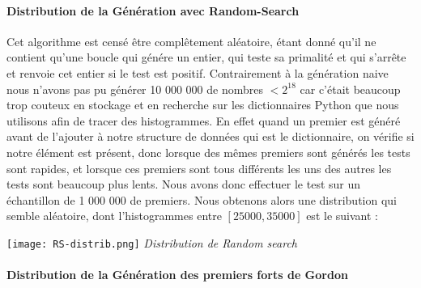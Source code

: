 \documentclass[a4paper,11pt]{article}
\begin{document}
\paragraph{Distribution de la Génération avec Random-Search}
Cet algorithme est censé être  complêtement aléatoire, étant donné qu'il ne contient qu'une boucle qui génére un entier, qui teste sa primalité et qui s'arrête et renvoie cet entier si le test est positif. Contrairement à la génération naive nous n'avons pas pu générer 10 000 000 de nombres $< 2^{18}$ car c'était beaucoup trop couteux en stockage et en recherche sur les dictionnaires Python que nous utilisons afin de tracer des histogrammes. En effet quand un premier est généré avant de l'ajouter à notre structure de données qui est le dictionnaire, on vérifie si notre élément est présent, donc lorsque des mêmes premiers sont générés les tests sont rapides, et lorsque ces premiers sont tous différents les uns des autres les tests sont beaucoup plus lents. Nous avons donc effectuer le test sur un échantillon de 1 000 000 de premiers. Nous obtenons alors une distribution qui semble aléatoire, dont l'histogrammes entre $[25 000,35 000]$ est le suivant : 

{\centering 
\texttt{[image: RS-distrib.png]}\newline
\hspace*{40mm}\emph{Distribution de Random search}
}\newline

\paragraph{Distribution de la Génération des premiers forts de Gordon}
\end{document}
